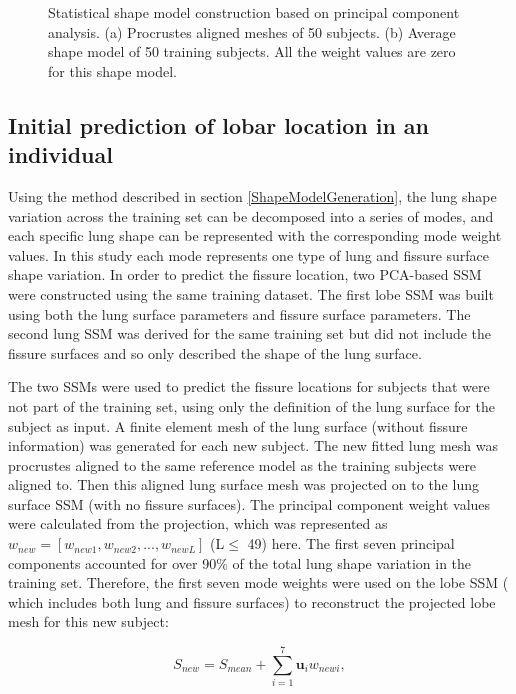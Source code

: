 {\begin{figure}[htbp]
\begin{subfigure}{.4\linewidth}
  \caption{}
  \label{fig:PCAMeshTraining-b} 
\end{subfigure}
\caption{Statistical shape model construction based on principal component analysis. (a) Procrustes aligned meshes of 50 subjects. (b) Average shape model of 50 training subjects. All the weight values are zero for this shape model.}
\label{fig:PCAMeshTraining}
\end{figure}

\subsection{Initial prediction of lobar location in an individual} \label{MeshPrediction}

Using the method described in section \ref{ShapeModelGeneration}, the lung shape variation across the training set can be decomposed into a series of modes, and each specific lung shape can be represented with the corresponding mode weight values. In this study each mode represents one type of lung and fissure surface shape variation. In order to predict the fissure location, two PCA-based SSM were constructed using the same training dataset. The first lobe SSM was built using both the lung surface parameters and fissure surface parameters. The second lung SSM was derived for the same training set but did not include the fissure surfaces and so only described the shape of the lung surface.

The two SSMs were used to predict the fissure locations for subjects that were not part of the training set, using only the definition of the lung surface for the subject as input. A finite element mesh of the lung surface (without fissure information) was generated for each new subject. The new fitted lung mesh was procrustes aligned to the same reference model as the training subjects were aligned to. Then this aligned lung surface mesh was projected on to the lung surface SSM (with no fissure surfaces). The principal component weight values were calculated from the projection, which was represented as $w_{new} = [w_{new1}, w_{new2}, ..., w_{newL}]$ (L$\leq$ 49) here. The first seven principal components accounted for over 90\% of the total lung shape variation in the training set. Therefore, the first seven mode weights were used on the lobe SSM ( which includes both lung and fissure surfaces) to reconstruct the projected lobe mesh for this new subject:

\begin{equation}
 \label{eq:FissurePrediction1}
 S_{new} = S_{mean} + \sum_{i=1}^7 \mathbf{u}_i w_{newi},
\end{equation}

}
